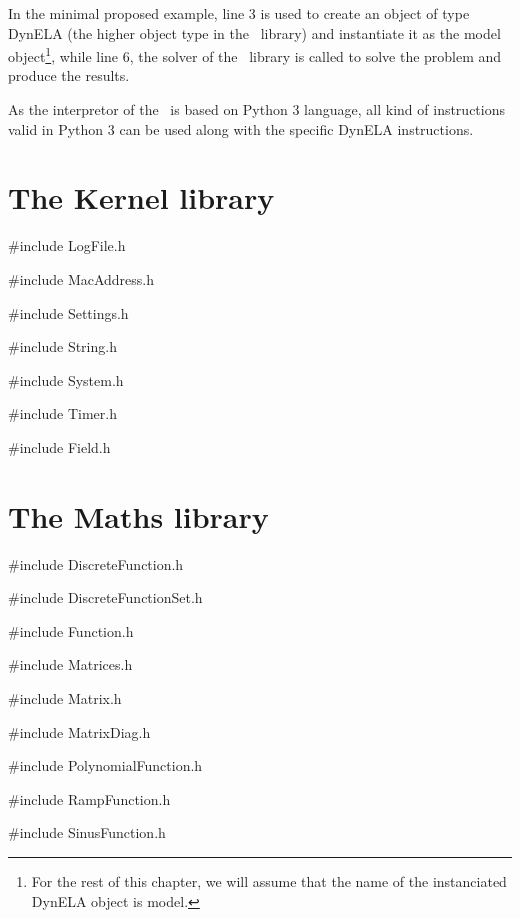 In the minimal proposed example, line 3 is used to create an object
of type \textsf{DynELA} (the higher object type in the \Dynela~library)
and instantiate it as the \textsf{model} object\footnote{For the rest of this chapter, we will assume that the name of the
instanciated \textsf{DynELA} object is \textsf{model.}}, while line 6, the solver of the \Dynela~library is called to solve
the problem and produce the results.

As the interpretor of the \Dynela~is based on Python 3 language,
all kind of instructions valid in Python 3 can be used along with
the specific DynELA instructions.

\section{The Kernel library}

\#include \textquotedbl LogFile.h\textquotedbl{}

\#include \textquotedbl MacAddress.h\textquotedbl{}

\#include \textquotedbl Settings.h\textquotedbl{}

\#include \textquotedbl String.h\textquotedbl{}

\#include \textquotedbl System.h\textquotedbl{}

\#include \textquotedbl Timer.h\textquotedbl{}

\#include \textquotedbl Field.h\textquotedbl{}

\section{The Maths library}

\#include \textquotedbl DiscreteFunction.h\textquotedbl{}

\#include \textquotedbl DiscreteFunctionSet.h\textquotedbl{}

\#include \textquotedbl Function.h\textquotedbl{}

\#include \textquotedbl Matrices.h\textquotedbl{}

\#include \textquotedbl Matrix.h\textquotedbl{}

\#include \textquotedbl MatrixDiag.h\textquotedbl{}

\#include \textquotedbl PolynomialFunction.h\textquotedbl{}

\#include \textquotedbl RampFunction.h\textquotedbl{}

\#include \textquotedbl SinusFunction.h\textquotedbl{}

